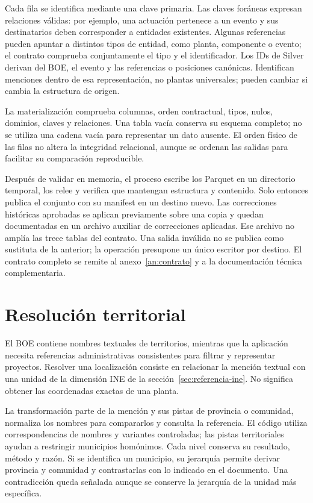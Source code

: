 Cada fila se identifica mediante una clave primaria. Las claves foráneas
expresan relaciones válidas: por ejemplo, una actuación pertenece a un evento
y sus destinatarios deben corresponder a entidades existentes. Algunas
referencias pueden apuntar a distintos tipos de entidad, como planta,
componente o evento; el contrato comprueba conjuntamente el tipo y el
identificador. Los IDs de Silver derivan del BOE, el evento y las referencias
o posiciones canónicas. Identifican menciones dentro de esa representación,
no plantas universales; pueden cambiar si cambia la estructura de origen.

La materialización comprueba columnas, orden contractual, tipos, nulos,
dominios, claves y relaciones. Una tabla vacía conserva su esquema completo;
no se utiliza una cadena vacía para representar un dato ausente. El orden
físico de las filas no altera la integridad relacional, aunque se ordenan
las salidas para facilitar su comparación reproducible.

Después de validar en memoria, el proceso escribe los Parquet en un directorio
temporal, los relee y verifica que mantengan estructura y contenido. Solo
entonces publica el conjunto con su manifest en un destino nuevo. Las
correcciones históricas aprobadas se aplican previamente sobre una copia y
quedan documentadas en un archivo auxiliar de correcciones aplicadas. Ese
archivo no amplía las trece tablas del contrato. Una salida inválida no se
publica como sustituta de la anterior; la operación presupone un único
escritor por destino. El contrato completo se remite al
anexo~\ref{an:contrato} y a la documentación técnica complementaria.

\section{Resolución territorial}
\label{sec:resolucion-territorial}
El BOE contiene nombres textuales de territorios, mientras que la aplicación
necesita referencias administrativas consistentes para filtrar y representar
proyectos. Resolver una localización consiste en relacionar la mención
textual con una unidad de la dimensión INE de la
sección~\ref{sec:referencia-ine}. No significa obtener las coordenadas exactas
de una planta.

La transformación parte de la mención y sus pistas de provincia o comunidad,
normaliza los nombres para compararlos y consulta la referencia. El código
utiliza correspondencias de nombres y variantes controladas; las pistas
territoriales ayudan a restringir municipios homónimos. Cada nivel conserva
su resultado, método y razón. Si se identifica un municipio, su jerarquía
permite derivar provincia y comunidad y contrastarlas con lo indicado en el
documento. Una contradicción queda señalada aunque se conserve la jerarquía
de la unidad más específica.

